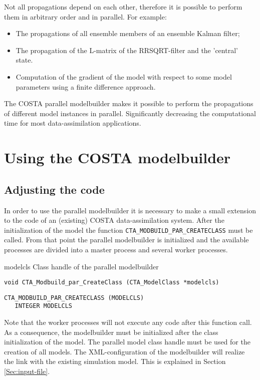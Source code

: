 Not all propagations depend on each other, therefore it is possible to
perform them in arbitrary order and in parallel. For example:
\begin{itemize}
\item The propagations of all ensemble members of an ensemble Kalman filter; 
\item The propagation of the L-matrix of the RRSQRT-filter and the 
      'central' state.
\item Computation of the gradient of the model with respect to some model
      parameters using a finite difference approach.
\end{itemize}

The COSTA parallel modelbuilder makes it possible to perform the
propagations of different model instances in parallel. Significantly decreasing
the computational time for most data-assimilation applications.

\section{Using the COSTA modelbuilder} \label{Sec:Using the COSTA modelbuilder}
\subsection{Adjusting the code}
In order to use the parallel modelbuilder it is necessary to make a small
extension to the code of an (existing) COSTA data-assimilation system.
After the initialization of the model the function 
{\tt CTA\_MODBUILD\_PAR\_CREATECLASS} must be called. From that
point the parallel modelbuilder is initialized and the available processes
are divided into  a master process and several worker processes.

\horzline
\begin{tabbing}
\functab
{}
 {modelcls}  {Class handle of the parallel modelbuilder }\\
\end{tabbing}
\horzline

\begin{verbatim}
void CTA_Modbuild_par_CreateClass (CTA_ModelClass *modelcls)
\end{verbatim}

\begin{verbatim}
CTA_MODBUILD_PAR_CREATECLASS (MODELCLS)
   INTEGER MODELCLS
\end{verbatim}

Note that the worker processes will not execute any code after this function
call. As a consequence, the modelbuilder must be initialized after the
class initialization of the model. The parallel model class handle must be
used for the creation of all models. The XML-configuration of the
modelbuilder will realize the link with the existing simulation model. This is
explained in Section \ref{Sec:input-file}. 

